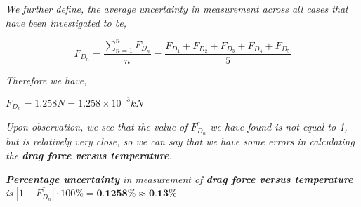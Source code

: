 \textit{We further define, the average uncertainty in measurement across all cases that have been investigated to be,} 

    $$\overline{F_{D_n}} = \frac{\sum_{n=1}^{n}F_{D_n}}{n} = \frac{F_{D_1} + F_{D_2} + F_{D_3} + F_{D_4} + F_{D_5}}{5}$$

\textit{Therefore we have,}

    $\overline{F_{D_n}} = 1.258 N = 1.258\times 10^{-3} kN$

\textit{Upon observation, we see that the value of $\overline{F_{D_n}}$ we have found is not equal to 1, but is relatively very close, so we can say that we have some errors in calculating the \textbf{drag force versus temperature}.}
        
        \textit{\textbf{Percentage uncertainty} in measurement of \textbf{drag force versus temperature} is $\left|1-\overline{F_{D_n}}\right|\cdot{100\%} = \textbf{0.1258\%} \approx \textbf{0.13\%}$}
        



